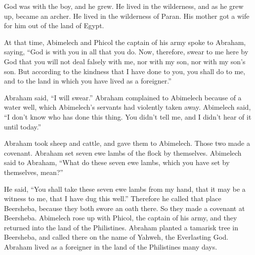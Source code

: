 {God was with the boy, and he grew. He lived in the wilderness, and as he grew up, became an archer.
He lived in the wilderness of Paran. His mother got a wife for him out of the land of Egypt.
\par }{\PP {}At that time, Abimelech and Phicol the captain of his army spoke to Abraham, saying, “God is with you in all that you do.
Now, therefore, swear to me here by God that you will not deal falsely with me, nor with my son, nor with my son’s son. But according to the kindness that I have done to you, you shall do to me, and to the land in which you have lived as a foreigner.”
\par }{\PP {}Abraham said, “I will swear.”
Abraham complained to Abimelech because of a water well, which Abimelech’s servants had violently taken away.
Abimelech said, “I don’t know who has done this thing. You didn’t tell me, and I didn’t hear of it until today.”
\par }{\PP {}Abraham took sheep and cattle, and gave them to Abimelech. Those two made a covenant.
Abraham set seven ewe lambs of the flock by themselves.
Abimelech said to Abraham, “What do these seven ewe lambs, which you have set by themselves, mean?”
\par }{\PP {}He said, “You shall take these seven ewe lambs from my hand, that it may be a witness to me, that I have dug this well.”
Therefore he called that place Beersheba, because they both swore an oath there.
So they made a covenant at Beersheba. Abimelech rose up with Phicol, the captain of his army, and they returned into the land of the Philistines.
Abraham planted a tamarisk tree in Beersheba, and called there on the name of Yahweh, the Everlasting God.
Abraham lived as a foreigner in the land of the Philistines many days.

}
